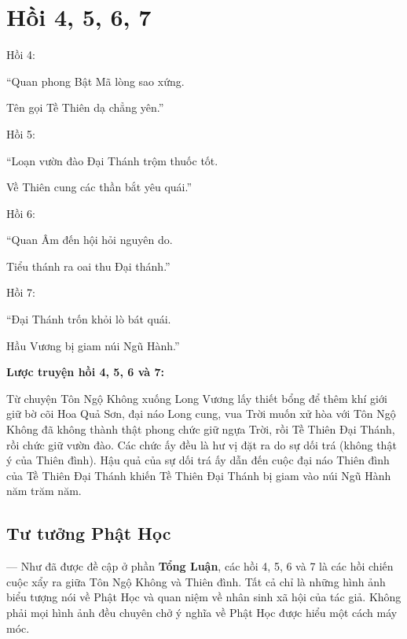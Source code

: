 \chapter{Hồi 4, 5, 6, 7} %
\label{cha:hoi_4_5_6_7}

Hồi 4:

\begin{itshape}
``Quan phong Bật Mã lòng sao xứng.

Tên gọi Tề Thiên dạ chẳng yên.''
\end{itshape}

Hồi 5:

\begin{itshape}
``Loạn vườn đào Đại Thánh trộm thuốc tốt.

Về Thiên cung các thần bắt yêu quái.''
\end{itshape}

Hồi 6:

\begin{itshape}
``Quan Âm đến hội hỏi nguyên do.

Tiểu thánh ra oai thu Đại thánh.''
\end{itshape}

Hồi 7:

\begin{itshape}
``Đại Thánh trốn khỏi lò bát quái.

Hầu Vương bị giam núi Ngũ Hành.''
\end{itshape}

{\bf Lược truyện hồi 4, 5, 6 và 7:}

Từ chuyện Tôn Ngộ Không xuống Long Vương lấy thiết bổng để thêm khí giới giữ bờ cõi Hoa Quả Sơn, đại náo Long cung, vua Trời muốn xử hòa với Tôn Ngộ Không đã không thành thật phong chức giữ ngựa Trời, rồi Tề Thiên Đại Thánh, rồi chức giữ vườn đào. Các chức ấy đều là hư vị đặt ra do sự dối trá (không thật ý của Thiên đình). Hậu quả của sự dối trá ấy dẫn đến cuộc đại náo Thiên đình của Tề Thiên Đại Thánh khiến Tề Thiên Đại Thánh bị giam vào núi Ngũ Hành năm trăm năm.

\section{Tư tưởng Phật Học} %
\label{sec:4_phat_hoc}

— Như đã được đề cập ở phần {\bf Tổng Luận}, các hồi 4, 5, 6 và 7 là các hồi chiến cuộc xẩy ra giữa Tôn Ngộ Không và Thiên đình. Tất cả chỉ là những hình ảnh biểu tượng nói về Phật Học và quan niệm về nhân sinh xã hội của tác giả. Không phải mọi hình ảnh đều chuyên chở ý nghĩa về Phật Học được hiểu một cách máy móc.

